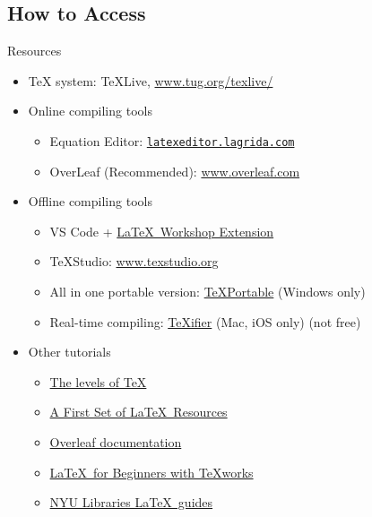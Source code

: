 \documentclass [xcolor=svgnames, t] {beamer}
\begin{document}
\subsection{How to Access}
\begin{frame}{Resources}
    \begin{itemize}
        \item TeX system: TeXLive, \url{www.tug.org/texlive/}
        \item Online compiling tools
        \begin{itemize}
            \item Equation Editor: \href{https://latexeditor.lagrida.com/}{\texttt{latexeditor.lagrida.com}}
            \item OverLeaf (Recommended): \url{www.overleaf.com}
        \end{itemize}
        \item Offline compiling tools
        \begin{itemize}
            \item VS Code + \href{{https://github.com/James-Yu/LaTeX-Workshop/wiki/Install}}{\LaTeX\ Workshop Extension}
            \item TeXStudio: \url{www.texstudio.org}
            \item All in one portable version: \href{https://github.com/symera/TexPortable}{TeXPortable} (Windows only)
            \item Real-time compiling: \href{www.texifier.com}{TeXifier} (Mac, iOS only) (not free)
        \end{itemize}
        \item Other tutorials
        \begin{itemize}
            \item \href{https://tug.org/levels.html}{The levels of TeX}
            \item \href{http://mirrors.ctan.org/info/latex-doc-ptr/latex-doc-ptr.pdf}{A First Set of \LaTeX\ Resources}
            \item \href{https://www.overleaf.com/learn}{Overleaf documentation}
            \item \href{https://www.colorado.edu/aps/latex-primer}{\LaTeX\ for Beginners with TeXworks}
            \item \href{https://guides.nyu.edu/LaTeX}{NYU Libraries \LaTeX\ guides}
        \end{itemize}
    \end{itemize}
\end{frame}
\end{document}
